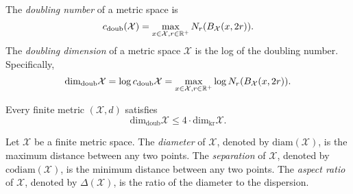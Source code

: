 \documentclass[../main.tex]{subfiles}
\newcommand{\set}[1]{\mathcal {#1}}
\newcommand{\radius}{r}
\newcommand{\diam}[1]{\text{diam}({#1})}
\newcommand{\codiam}[1]{\text{codiam}({#1})}
\newcommand{\aspect}[1]{\Delta({#1})}
\newcommand{\minkdim}{\text{dim}_\text{Mink}}
\newcommand{\krdim}{\text{dim}_\text{kr}}
\newcommand{\doubdim}{\text{dim}_\text{doub}}
\newcommand{\doubnum}{c_\text{doub}}
\begin{document}
%

%

\begin{definition}
    The \emph{doubling number} of a metric space is
    \begin{equation}
        \doubnum(\set X) = \max_{x\in\set X, \radius\in\R^+} N_\radius(B_{\set X}(x,2\radius))
        .
    \end{equation}
    The \emph{doubling dimension} of a metric space $\set X$ is the log of the doubling number.
    Specifically,
    \begin{equation}
        \doubdim \set X = \log \doubnum\set X = \max_{x\in\set X, \radius\in\R^+} \log N_\radius(B_{\set X}(x,2\radius))
        .
    \end{equation}
\end{definition}
\cite{gupta2003bounded}

\begin{lemma}
    Every finite metric $(\set X,d)$ satisfies
    \begin{equation}
        \doubdim\set X \le 4\cdot\krdim\set X
        .
    \end{equation}
\end{lemma}

\begin{definition}
    Let $\set X$ be a finite metric space.
    The \emph{diameter} of $\set X$, denoted by $\diam{\set X}$, is the maximum distance between any two points.
    The \emph{separation} of $\set X$, denoted by $\codiam{\set X}$, is the minimum distance between any two points.
    The \emph{aspect ratio} of $\set X$, denoted by $\aspect{\set X}$, is the ratio of the diameter to the dispersion.
\end{definition}
\end{document}
